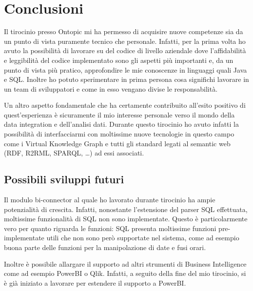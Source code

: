 \chapter{Conclusioni}
\label{cha:conclusions}
Il tirocinio presso Ontopic mi ha permesso di acquisire nuove competenze sia da un punto di vista puramente tecnico che 
personale. Infatti, per la prima volta ho avuto la possibilità di lavorare su del codice di livello aziendale dove 
l'affidabilità e leggibilità del codice implementato sono gli aspetti più importanti e, da un punto di vista più
pratico, approfondire le mie conoscenze in linguaggi quali Java e SQL. Inoltre ho potuto sperimentare in prima persona cosa significhi lavorare in un team di sviluppatori e come in esso 
vengano divise le responsabilità.

Un altro aspetto fondamentale che ha certamente contribuito all'esito positivo di quest'esperienza è sicuramente il 
mio interesse personale verso il mondo della data integration e dell'analisi dati. Durante questo 
tirocinio ho avuto infatti la possibilità di interfacciarmi con moltissime nuove tecnologie in questo campo come i Virtual Knowledge
Graph e tutti gli standard legati al semantic web (RDF, R2RML, SPARQL, \dots) ad essi associati.

\section{Possibili sviluppi futuri}
\label{sec:conclusions_future}
Il modulo bi-connector al quale ho lavorato durante tirocinio ha ampie potenzialità di crescita. Infatti, nonostante l'estensione
del parser SQL effettuata, moltissime funzionalità di SQL non sono implementate. Questo è particolarmente vero per quanto 
riguarda le funzioni: SQL presenta moltissime funzioni pre-implementate utili che non sono però supportate nel sistema,
come ad esempio buona parte delle funzioni per la manipolazione di date e fusi orari.

Inoltre è possibile allargare il supporto ad altri strumenti di Business Intelligence come ad esempio PowerBI o Qlik. Infatti, 
a seguito della fine del mio tirocinio, si è già iniziato a lavorare per estendere il supporto a PowerBI.

